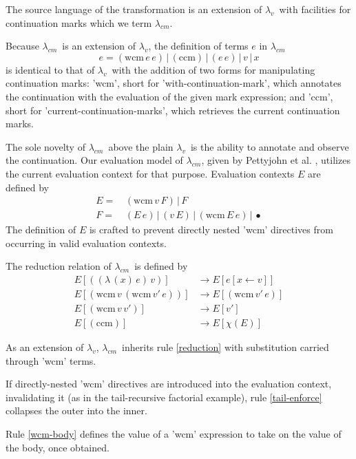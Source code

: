 \documentclass{llncs}
\newcommand{\cm}[0]{$\lambda_{cm}$}
\newcommand{\lv}[0]{$\lambda_v$}
\newcommand{\wcm}[2]{(\mathrm{wcm}\,#1\,#2)}
\newcommand{\ccm}[0]{(\mathrm{ccm})}
\newcommand{\app}[2]{(#1\,#2)}
\newcommand{\abs}[2]{(\lambda\,(#1)\,#2)}
\newcommand{\hole}[0]{\bullet}
\newcommand{\rr}[0]{\rightarrow}
\begin{document}
The source language of the transformation is an extension of \lv\ with facilities for continuation marks which we term \cm.

Because \cm\ is an extension of \lv, the definition of terms $e$ in \cm\ 
\begin{equation}
e=\wcm{e}{e}\,|\,\ccm\,|\,\app{e}{e}\,|\,v\,|\,x
\end{equation}
is identical to that of \lv\ with the addition of two forms for manipulating continuation marks: \scheme'wcm', short for \scheme'with-continuation-mark', which annotates the continuation with the evaluation of the given mark expression; and \scheme'ccm', short for \scheme'current-continuation-marks', which retrieves the current continuation marks.

The sole novelty of \cm\ above the plain \lv\ is the ability to annotate and observe the continuation. Our evaluation model of \cm, given by Pettyjohn et al. \cite{pettyjohn2005continuations}, utilizes the current evaluation context for that purpose. Evaluation contexts $E$ are defined by
\begin{align}
E=\, &\wcm{v}{F}\,|\,F\\
F=\, &\app{E}{e}\,|\,\app{v}{E}\,|\,\wcm{E}{e}\,|\,\hole
\end{align}
The definition of $E$ is crafted to prevent directly nested \scheme'wcm' directives from occurring in valid evaluation contexts.

The reduction relation of \cm\ is defined by
\begin{align}
E[\app{\abs{x}{e}}{v}]  &\rr E[e[x\leftarrow v]]\label{reduction}\\
E[\wcm{v}{\wcm{v'}{e}}] &\rr E[\wcm{v'}{e}]\label{tail-enforce}\\
E[\wcm{v}{v'}]          &\rr E[v']\label{wcm-body}\\
E[\ccm]                 &\rr E[\chi(E)]\label{ccm-in-context}
\end{align}

As an extension of \lv, \cm\ inherits rule \ref{reduction} with substitution carried through \scheme'wcm' terms.

If directly-nested \scheme'wcm' directives are introduced into the evaluation context, invalidating it (as in the tail-recursive factorial example), rule \ref{tail-enforce} collapses the outer into the inner.

Rule \ref{wcm-body} defines the value of a \scheme'wcm' expression to take on the value of the body, once obtained.
\end{document}
